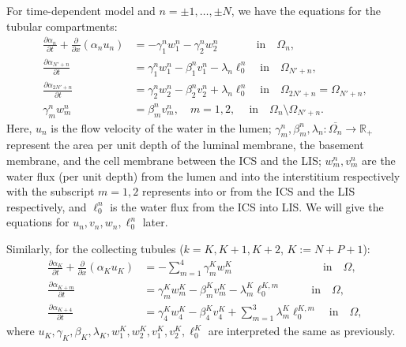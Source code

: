 \documentclass{article}
\begin{document}
For time-dependent model and $n=\pm 1,\dots,\pm N$, we have the equations for the tubular compartments:
\begin{align}
    \frac{\partial \alpha_n}{\partial t} + \frac{\partial}{\partial x}(\alpha_nu_n) &= -\gamma_1^nw_{1}^n-\gamma_2^nw_{2}^n\quad \quad \quad \ \ \text{in}\quad \Omega_{n},\\
    \frac{\partial \alpha_{N'+n}}{\partial t} &= \gamma_1^nw_{1}^n-\beta_1^nv_1^n-\lambda_n\ell_0^n\quad \text{in}\quad \Omega_{N'+n},\\
    \frac{\partial \alpha_{2N'+n}}{\partial t} &= \gamma_2^nw_{2}^n-\beta_2^nv_2^n+\lambda_n\ell_0^n\quad \text{in}\quad \Omega_{2N'+n}=\Omega_{N'+n},\\
    \gamma_m^nw_m^n &= \beta_m^nv_m^n,\quad m=1,2,\quad \ \text{in}\quad \Omega_n\setminus\Omega_{N'+n}.
\end{align}
Here, $u_n$ is the flow velocity of the water in the lumen;
$\gamma_m^n,\beta_m^n,\lambda_n:\overline{\Omega_n}\to \mathbb{R}_+$ represent the area per unit depth of the luminal membrane, the basement membrane, and the cell membrane between the ICS and the LIS;
$w^n_m,v^n_m$ are the water flux (per unit depth) from the lumen and into the interstitium respectively with the subscript $m=1,2$ represents into or from the ICS and the LIS respectively, and $\ell_0^n$ is the water flux from the ICS into LIS.
We will give the equations for $u_n,v_n,w_n,\ell_0^n$ later.

Similarly, for the collecting tubules ($k=K,K+1,K+2$, $K:=N+P+1$):
\begin{align}
    \frac{\partial \alpha_K}{\partial t} + \frac{\partial}{\partial x}(\alpha_Ku_K) &= -\sum_{m=1}^4\gamma_m^Kw_{m}^K\qquad \qquad \qquad \qquad \ \text{in}\quad \Omega,\\
    \frac{\partial \alpha_{K+m}}{\partial t} &= \gamma_m^Kw_{m}^K-\beta_m^Kv_m^K-\lambda_m^K\ell_0^{K,m}\qquad \ \ \ \text{in}\quad \Omega,\\
    \frac{\partial \alpha_{K+4}}{\partial t} &= \gamma_4^Kw_{4}^K-\beta_4^Kv_4^K+\sum_{m=1}^3\lambda_m^K\ell_0^{K,m}\quad \text{in}\quad \Omega,
\end{align}
where $u_K,\gamma_K,\beta_K,\lambda_K,w_1^K,w_2^K,v_1^K,v_2^K,\ell^K_0$ are interpreted the same as previously.
\end{document}
